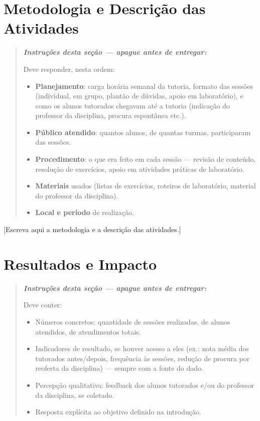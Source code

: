 \documentclass[article,12pt,a4paper]{abntex2}
\newenvironment{instrucoes}{%
  \begin{quotation}\footnotesize\itshape
  \noindent\textbf{\upshape Instruções desta seção — apague antes de entregar:}\par\smallskip
}{%
  \end{quotation}
}
\begin{document}
\section{Metodologia e Descrição das Atividades}

\begin{instrucoes}
Deve responder, nesta ordem:
\begin{itemize}
  \item \textbf{Planejamento}: carga horária semanal da tutoria, formato das sessões (individual, em grupo, plantão de dúvidas, apoio em laboratório), e como os alunos tutorados chegavam até a tutoria (indicação do professor da disciplina, procura espontânea etc.).
  \item \textbf{Público atendido}: quantos alunos, de quantas turmas, participaram das sessões.
  \item \textbf{Procedimento}: o que era feito em cada sessão — revisão de conteúdo, resolução de exercícios, apoio em atividades práticas de laboratório.
  \item \textbf{Materiais} usados (listas de exercícios, roteiros de laboratório, material do professor da disciplina).
  \item \textbf{Local e período} de realização.
\end{itemize}
\end{instrucoes}

[Escreva aqui a metodologia e a descrição das atividades.]

\section{Resultados e Impacto}

\begin{instrucoes}
Deve conter:
\begin{itemize}
  \item Números concretos: quantidade de sessões realizadas, de alunos atendidos, de atendimentos totais.
  \item Indicadores de resultado, se houver acesso a eles (ex.: nota média dos tutorados antes/depois, frequência às sessões, redução de procura por reoferta da disciplina) — sempre com a fonte do dado.
  \item Percepção qualitativa: feedback dos alunos tutorados e/ou do professor da disciplina, se coletado.
  \item Resposta explícita ao objetivo definido na introdução.
\end{itemize}
\end{instrucoes}
\end{document}
